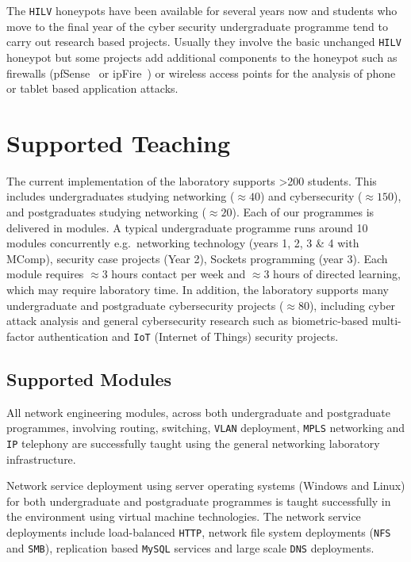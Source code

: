 \documentclass[10pt,journal]{IEEEtran}
\begin{document}
The \texttt{HILV} honeypots have been available for several years now and students who move to the final year of the cyber security undergraduate programme tend to carry out research based projects. Usually they involve the basic unchanged \texttt{HILV} honeypot but some projects add additional components to the honeypot such as firewalls (pfSense~\cite{PFSENSE:18} or ipFire~\cite{IPFIRE:18}) or wireless access points for the analysis of phone or tablet based application attacks.  

\section{Supported Teaching\label{ResourceSupport}}

The current implementation of the laboratory supports \textgreater200 students. This
includes undergraduates studying networking ($\approx40$) and cybersecurity
($\approx150$), and postgraduates studying networking ($\approx20$). Each of our
programmes is delivered in modules. A typical undergraduate programme runs
around 10 modules concurrently e.g.\ networking technology (years 1, 2, 3 \&
4 with MComp), security case projects (Year 2), Sockets programming (year 3).
Each module requires $\approx3$ hours contact per week and $\approx3$ hours of
directed learning, which may require laboratory time.  In addition, the
laboratory supports many undergraduate and postgraduate cybersecurity projects
($\approx80$), including cyber attack analysis and general cybersecurity research
such as biometric-based multi-factor authentication and \texttt{IoT} (Internet
of Things) security projects.

\subsection{Supported Modules\label{Modules}}

All network engineering modules, across both undergraduate and postgraduate
programmes, involving routing, switching, \texttt{VLAN} deployment,
\texttt{MPLS} networking and \texttt{IP} telephony are successfully taught
using the general networking laboratory infrastructure.

Network service deployment using server operating systems (Windows and Linux)
for both undergraduate and postgraduate programmes is taught successfully in
the environment using virtual machine technologies. The network service
deployments include load-balanced \texttt{HTTP}, network file system
deployments (\texttt{NFS} and \texttt{SMB}), replication based \texttt{MySQL}
services and large scale \texttt{DNS} deployments.
\end{document}
